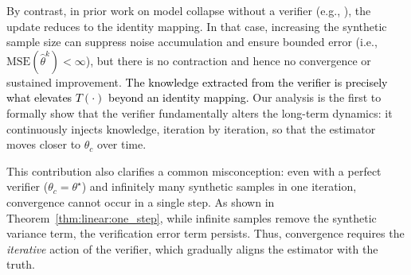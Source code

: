 By contrast, in prior work on model collapse without a verifier (e.g., \citet{gerstgrasser2024model, xu2025probabilistic}), the update reduces to the identity mapping.  
In that case, increasing the synthetic sample size can suppress noise accumulation and ensure bounded error (i.e., $\text{MSE}(\hat{\theta}^k) < \infty$), but there is no contraction and hence no convergence or sustained improvement. 
\textcolor{black}{The knowledge extracted from the verifier is precisely what elevates $T(\cdot)$ beyond an identity mapping.}
Our analysis is the first to formally show that the verifier fundamentally alters the long-term dynamics: it continuously injects knowledge, iteration by iteration, so that the estimator moves closer to $\theta_c$ over time.  

This contribution also clarifies a common misconception: even with a perfect verifier ($\theta_c = \theta^\star$) and infinitely many synthetic samples in one iteration, convergence cannot occur in a single step.  
As shown in Theorem~\ref{thm:linear:one_step}, while infinite samples remove the synthetic variance term, the verification error term persists.  
Thus, convergence requires the \emph{iterative} action of the verifier, which gradually aligns the estimator with the truth.



